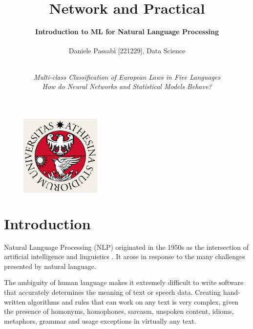 \documentclass[letterpaper,11pt]{article}
\begin{document}
\pagecolor{ivory}

\title{\textbf{Network and Practical}}
\author{\textbf{Introduction to ML for Natural Language Processing}\\ \\ Daniele Passabì [221229], Data Science\\}

\date{\textit{\\Multi-class Classification of European Laws in Five Languages\\How do Neural Networks and Statistical Models Behave?}}
\maketitle
\thispagestyle{empty}

\begin{figure}[H] 
  \centering
  \includegraphics[width=4cm]{logo.png}
\end{figure}

\newpage
\pagecolor{white}
\setcounter{tocdepth}{2}
\tableofcontents
\thispagestyle{empty}

\newpage
\clearpage
{}



\section{Introduction}

Natural Language Processing (NLP) originated in the 1950s as the intersection of
artificial intelligence and linguistics \cite{nadkarni2011natural}. It arose in response to the many challenges presented by natural language.

The ambiguity of human language makes it extremely difficult to write software that accurately determines the meaning of text or speech data. Creating hand-written algorithms and rules that can work on any text is very complex, given the presence of homonyms, homophones, sarcasm, unspoken content, idioms, metaphors, grammar and usage exceptions in virtually any text.
\end{document}
